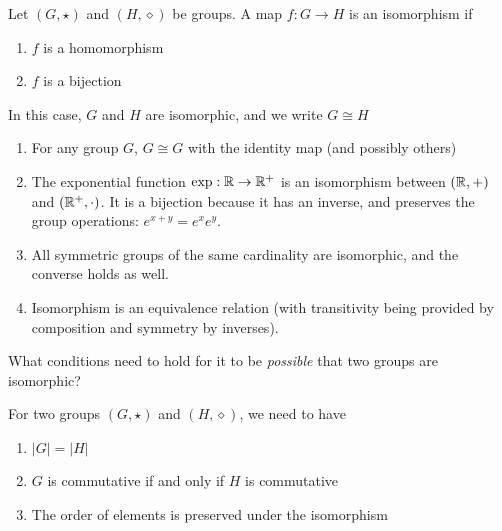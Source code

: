 \documentclass[a5paper]{article}
\begin{document}
\begin{definition}
  Let $(G,\star)$ and $(H, \diamond)$ be groups. A map $f:G\to H$ is an
  isomorphism if
  \begin{enumerate}
    \item $f$ is a homomorphism
    \item $f$ is a bijection
  \end{enumerate}
  In this case, $G$ and $H$ are isomorphic, and we write $G\cong H$
\end{definition}

\begin{example}[Isomorphisms]
	\begin{enumerate}
    \itemsep0em
    \item For any group $G$, $G\cong G$ with the identity map (and possibly others)
    \item The exponential function $\operatorname{exp}:\mathbb{R}\to\mathbb{R}^+$ is an
      isomorphism between $(\mathbb{R},+)$ and $(\mathbb{R}^+,\cdot)$. It is a bijection because
      it has an inverse, and preserves the group operations: $e^{x+y}=e^xe^y$.
    \item All symmetric groups of the same cardinality are isomorphic, and the
      converse holds as well.
    \item Isomorphism is an equivalence relation (with transitivity being
      provided by composition and symmetry by inverses).
  \end{enumerate}
\end{example}

\begin{note}
  \begin{field}
    What conditions need to hold for it to be \textit{possible} that two groups
    are isomorphic?
  \end{field}

  \begin{field}
    For two groups $(G,\star)$ and $(H, \diamond)$, we need to have
    \begin{enumerate}%
      \item $|G|=|H|$
      \item $G$ is commutative if and only if $H$ is commutative
      \item The order of elements is preserved under the isomorphism
    \end{enumerate}
  \end{field}
\end{note}
\end{document}
